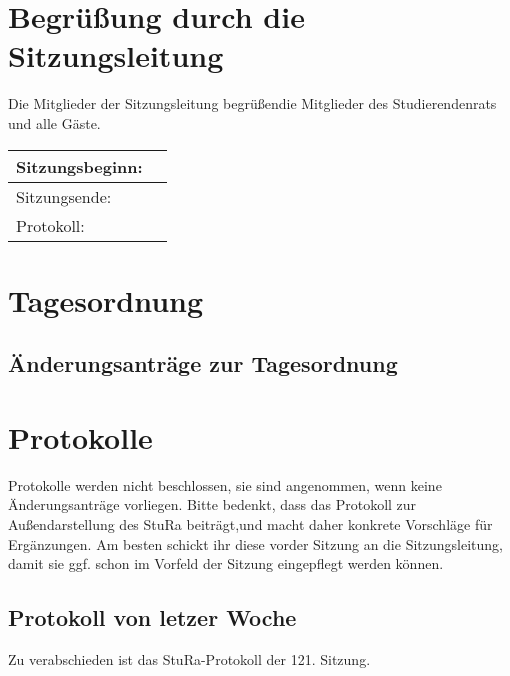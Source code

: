 \section{Begrü\ss ung durch die Sitzungsleitung}
Die Mitglieder  der  Sitzungsleitung begrüßendie  Mitglieder  des  Studierendenrats  und  alle Gäste.
\begin{center}
    \begin{tabular}{|m{5cm}|m{5cm}|}
        \hline
        Sitzungsbeginn: & \\\hline
        Sitzungsende: & \\\hline
        Protokoll: & \\\hline
    \end{tabular}
\end{center}


\section{Tagesordnung}

\subsection{Änderungsanträge zur Tagesordnung}


\section{Protokolle}
Protokolle werden nicht beschlossen, sie sind angenommen, wenn keine Änderungsanträge vorliegen.
Bitte bedenkt, dass das Protokoll zur Außendarstellung des StuRa beiträgt,und macht daher konkrete Vorschläge
für Ergänzungen. Am besten schickt ihr diese vorder Sitzung an die Sitzungsleitung, damit sie ggf. schon im 
Vorfeld der Sitzung eingepflegt werden können.
\subsection{Protokoll von letzer Woche}
Zu verabschieden ist das StuRa-Protokoll der 121. Sitzung.
